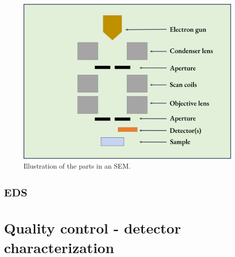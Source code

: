 \begin{figure}[ht]
    \centering
    \includegraphics[width=0.8\linewidth]{figures/SEM_setup.png}
    \caption{
        Illustration of the parts in an SEM.
    }
    \label{fig:SEM_setup}
\end{figure}








\subsection{EDS}












\section{Quality control - detector characterization}
\label{theory:qc}

